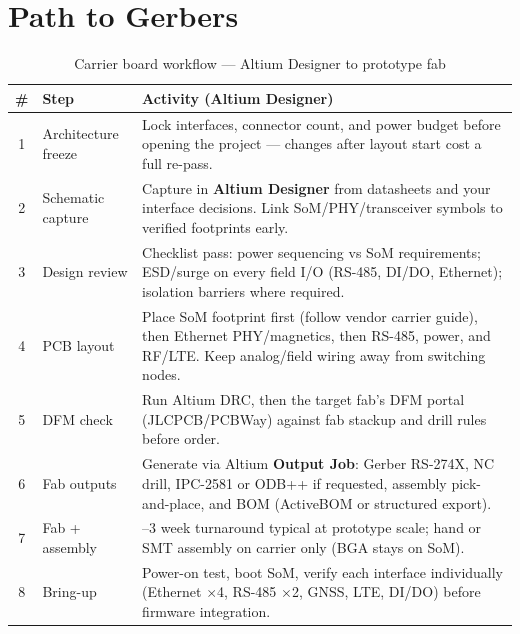 \documentclass[11pt,a4paper]{article}
\begin{document}
\section{Path to Gerbers}

\begin{table}[htbp]
\centering
\caption{Carrier board workflow --- Altium Designer to prototype fab}
\label{tab:path-to-gerbers}
\renewcommand{\arraystretch}{1.12}
\small
\begin{tabularx}{\linewidth}{@{}c>{\raggedright\arraybackslash}p{2.4cm}>{\RaggedRight\arraybackslash}X@{}}
\toprule
\textbf{\#} & \textbf{Step} & \textbf{Activity (Altium Designer)} \\
\midrule
1 & Architecture freeze &
Lock interfaces, connector count, and power budget before opening the project --- changes after layout start cost a full re-pass. \\
2 & Schematic capture &
Capture in \textbf{Altium Designer} from datasheets and your interface decisions. Link SoM/PHY/transceiver symbols to verified footprints early. \\
3 & Design review &
Checklist pass: power sequencing vs SoM requirements; ESD/surge on every field I/O (RS-485, DI/DO, Ethernet); isolation barriers where required. \\
4 & PCB layout &
Place SoM footprint first (follow vendor carrier guide), then Ethernet PHY/magnetics, then RS-485, power, and RF/LTE. Keep analog/field wiring away from switching nodes. \\
5 & DFM check &
Run Altium DRC, then the target fab's DFM portal (JLCPCB/PCBWay) against fab stackup and drill rules before order. \\
6 & Fab outputs &
Generate via Altium \textbf{Output Job}: Gerber RS-274X, NC drill, IPC-2581 or ODB++ if requested, assembly pick-and-place, and BOM (ActiveBOM or structured export). \\
7 & Fab + assembly &
1--3 week turnaround typical at prototype scale; hand or SMT assembly on carrier only (BGA stays on SoM). \\
8 & Bring-up &
Power-on test, boot SoM, verify each interface individually (Ethernet $\times$4, RS-485 $\times$2, GNSS, LTE, DI/DO) before firmware integration. \\
\bottomrule
\end{tabularx}
\end{table}
\end{document}
